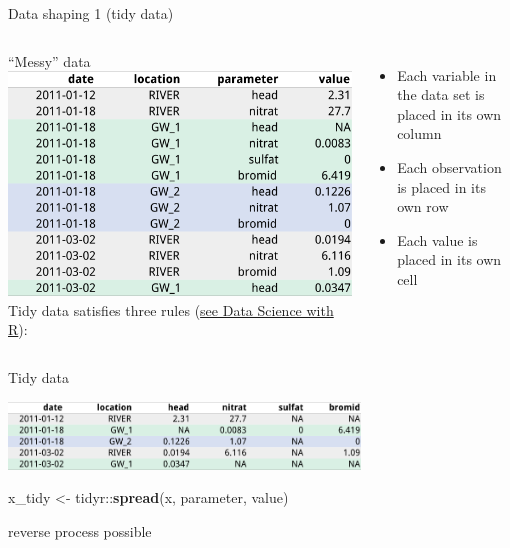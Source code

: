 \documentclass[8pt,ignorenonframetext,]{beamer}
\newenvironment{Shaded}{\begin{snugshade}}{\end{snugshade}}
\newcommand{\KeywordTok}[1]{\textcolor[rgb]{0.13,0.29,0.53}{\textbf{{#1}}}}
\newcommand{\StringTok}[1]{\textcolor[rgb]{0.31,0.60,0.02}{{#1}}}
\newcommand{\NormalTok}[1]{{#1}}
\providecommand{\tightlist}{%
  \setlength{\itemsep}{0pt}\setlength{\parskip}{0pt}}
\newcommand{\columnsbegin}{\begin{columns}}
\newcommand{\columnsend}{\end{columns}}
\begin{document}
\begin{frame}[fragile]{Data shaping 1 (tidy data)}

\columnsbegin
{} ``Messy'' data
\includegraphics{imgPres/data_tidying_table_messy.png}
 Tidy data satisfies three rules
(\href{http://garrettgman.github.io/tidying/}{see Data Science with R}):

\begin{itemize}
\tightlist
\item
  Each variable in the data set is placed in its own column
\item
  Each observation is placed in its own row
\item
  Each value is placed in its own cell
\end{itemize}

\columnsend

Tidy data

\includegraphics[width=0.70000\textwidth]{imgPres/data_tidying_table_tidy.png}

\begin{Shaded}
\begin{Highlighting}[]
\NormalTok{x_tidy <-}\StringTok{ }\NormalTok{tidyr::}\KeywordTok{spread}\NormalTok{(x, parameter, value)}
\end{Highlighting}
\end{Shaded}

reverse process possible

\end{frame}
\end{document}
